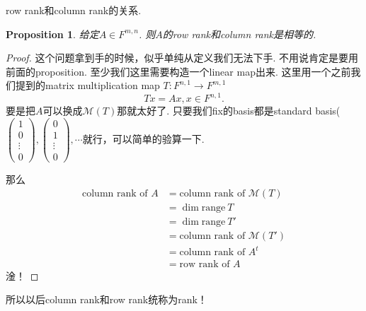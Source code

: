 \documentclass{article}
\newtheorem{proposition}[theorem]{Proposition}
\newcommand*{\xfunc}[4]{{#2}\colon{#3}{#1}{#4}}
\newcommand*{\func}[3]{\xfunc{\to}{#1}{#2}{#3}}
\newcommand\range[1]{\text{range}\ #1}
\begin{document}
{\color{red} row rank和column rank的关系}.
\begin{proposition}
\rm 给定$A \in F^{m,n}$. 则$A$的row rank和column rank是相等的.
\end{proposition}

\begin{proof}
这个问题拿到手的时候，似乎单纯从定义我们无法下手. 不用说肯定是要用前面的proposition. 至少我们这里需要构造一个linear map出来. 这里用一个之前我们提到的matrix multiplication map $\func{T}{F^{n,1}}{F^{m,1}}$
$$
Tx=Ax, x \in F^{n,1}.
$$
要是把$A$可以换成$\mathcal{M}(T)$那就太好了. 只要我们fix的basis都是standard basis($\begin{pmatrix} 1\\0 \\ \vdots \\ 0 \end{pmatrix},\begin{pmatrix} 0\\1 \\ \vdots \\ 0 \end{pmatrix},\cdots$就行，可以简单的验算一下.

那么
$$
\begin{aligned}
\text{column rank of } A &= \text{column rank of } \mathcal{M}(T) \\
						 &= \dim \range{T} \\
						 &= \dim \range{T'} \\
						 &= \text{column rank of } \mathcal{M}(T')\\
						 &= \text{column rank of } A^{t} \\
						 &= \text{row rank of } A 	
\end{aligned}
$$
淦！
\end{proof}

{\color{blue} 所以以后column rank和row rank统称为rank}！
\end{document}

